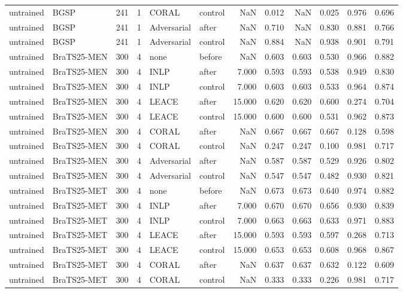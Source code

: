 \begin{tabular}{llrrllrrrrrr}
untrained & BGSP & 241 & 1 & CORAL & control & NaN & 0.012 & NaN & 0.025 & 0.976 & 0.696 \\
untrained & BGSP & 241 & 1 & Adversarial & after & NaN & 0.710 & NaN & 0.830 & 0.881 & 0.766 \\
untrained & BGSP & 241 & 1 & Adversarial & control & NaN & 0.884 & NaN & 0.938 & 0.901 & 0.791 \\
untrained & BraTS25-MEN & 300 & 4 & none & before & NaN & 0.603 & 0.603 & 0.530 & 0.966 & 0.882 \\
untrained & BraTS25-MEN & 300 & 4 & INLP & after & 7.000 & 0.593 & 0.593 & 0.538 & 0.949 & 0.830 \\
untrained & BraTS25-MEN & 300 & 4 & INLP & control & 7.000 & 0.603 & 0.603 & 0.533 & 0.964 & 0.874 \\
untrained & BraTS25-MEN & 300 & 4 & LEACE & after & 15.000 & 0.620 & 0.620 & 0.600 & 0.274 & 0.704 \\
untrained & BraTS25-MEN & 300 & 4 & LEACE & control & 15.000 & 0.600 & 0.600 & 0.531 & 0.962 & 0.873 \\
untrained & BraTS25-MEN & 300 & 4 & CORAL & after & NaN & 0.667 & 0.667 & 0.667 & 0.128 & 0.598 \\
untrained & BraTS25-MEN & 300 & 4 & CORAL & control & NaN & 0.247 & 0.247 & 0.100 & 0.981 & 0.717 \\
untrained & BraTS25-MEN & 300 & 4 & Adversarial & after & NaN & 0.587 & 0.587 & 0.529 & 0.926 & 0.802 \\
untrained & BraTS25-MEN & 300 & 4 & Adversarial & control & NaN & 0.547 & 0.547 & 0.482 & 0.930 & 0.821 \\
untrained & BraTS25-MET & 300 & 4 & none & before & NaN & 0.673 & 0.673 & 0.640 & 0.974 & 0.882 \\
untrained & BraTS25-MET & 300 & 4 & INLP & after & 7.000 & 0.670 & 0.670 & 0.656 & 0.930 & 0.839 \\
untrained & BraTS25-MET & 300 & 4 & INLP & control & 7.000 & 0.663 & 0.663 & 0.633 & 0.971 & 0.883 \\
untrained & BraTS25-MET & 300 & 4 & LEACE & after & 15.000 & 0.593 & 0.593 & 0.597 & 0.268 & 0.713 \\
untrained & BraTS25-MET & 300 & 4 & LEACE & control & 15.000 & 0.653 & 0.653 & 0.608 & 0.968 & 0.867 \\
untrained & BraTS25-MET & 300 & 4 & CORAL & after & NaN & 0.637 & 0.637 & 0.632 & 0.122 & 0.609 \\
untrained & BraTS25-MET & 300 & 4 & CORAL & control & NaN & 0.333 & 0.333 & 0.226 & 0.981 & 0.717 \\

\end{tabular}
